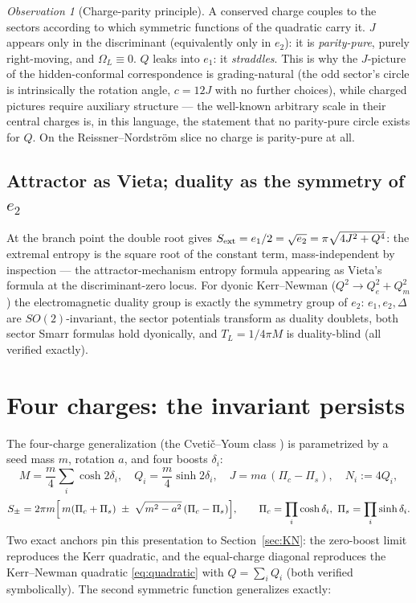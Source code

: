 \documentclass[11pt]{article}
\theoremstyle{definition}
\theoremstyle{remark}
\newtheorem{observation}[theorem]{Observation}
\newcommand{\disc}{\Delta}
\begin{document}
\begin{observation}[Charge-parity principle]
\label{obs:parity}
A conserved charge couples to the sectors according to which symmetric
functions of the quadratic carry it. $J$ appears only in the discriminant
(equivalently only in $e_2$): it is \emph{parity-pure}, purely right-moving,
and $\Omega_L\equiv0$. $Q$ leaks into $e_1$: it \emph{straddles}. This is why
the $J$-picture of the hidden-conformal correspondence is grading-natural
(the odd sector's circle is intrinsically the rotation angle, $c=12J$ with no
further choices), while charged pictures require auxiliary structure --- the
well-known arbitrary scale in their central charges is, in this language, the
statement that no parity-pure circle exists for $Q$. On the
Reissner--Nordstr\"om slice no charge is parity-pure at all.
\end{observation}

\subsection{Attractor as Vieta; duality as the symmetry of $e_2$}

At the branch point the double root gives
$S_{\rm ext}=e_1/2=\sqrt{e_2}=\pi\sqrt{4J^2+Q^4}$: the extremal entropy is the
square root of the constant term, mass-independent by inspection --- the
attractor-mechanism entropy formula \cite{Moore} appearing as Vieta's formula
at the discriminant-zero locus. For dyonic Kerr--Newman
($Q^2\to Q_e^2+Q_m^2$) the electromagnetic duality group is exactly the
symmetry group of $e_2$: $e_1,e_2,\disc$ are $SO(2)$-invariant, the sector
potentials transform as duality doublets, both sector Smarr formulas hold
dyonically, and $T_L=1/4\pi M$ is duality-blind (all verified exactly).

\section{Four charges: the invariant persists}
\label{sec:fourcharge}

The four-charge generalization (the Cveti\v{c}--Youm class \cite{CY,Std4Q})
is parametrized by a seed mass $m$, rotation $a$, and four boosts $\delta_i$:
\begin{equation}
M=\frac{m}{4}\sum_i\cosh2\delta_i,\quad
Q_i=\frac{m}{4}\sinh2\delta_i,\quad
J=ma\,(\Pi_c-\Pi_s),\quad
N_i:=4Q_i ,
\end{equation}
\begin{equation}
S_\pm = 2\pi m\Bigl[\,m(\Pi_c+\Pi_s)\;\pm\;\sqrt{m^2-a^2}\,(\Pi_c-\Pi_s)\Bigr],
\qquad \Pi_c=\prod_i\cosh\delta_i,\ \Pi_s=\prod_i\sinh\delta_i .
\label{eq:fourchargeS}
\end{equation}
Two exact anchors pin this presentation to Section~\ref{sec:KN}: the
zero-boost limit reproduces the Kerr quadratic, and the equal-charge diagonal
reproduces the Kerr--Newman quadratic \eqref{eq:quadratic} with
$Q=\sum_iQ_i$ (both verified symbolically). The second symmetric function
generalizes exactly:
\end{document}
